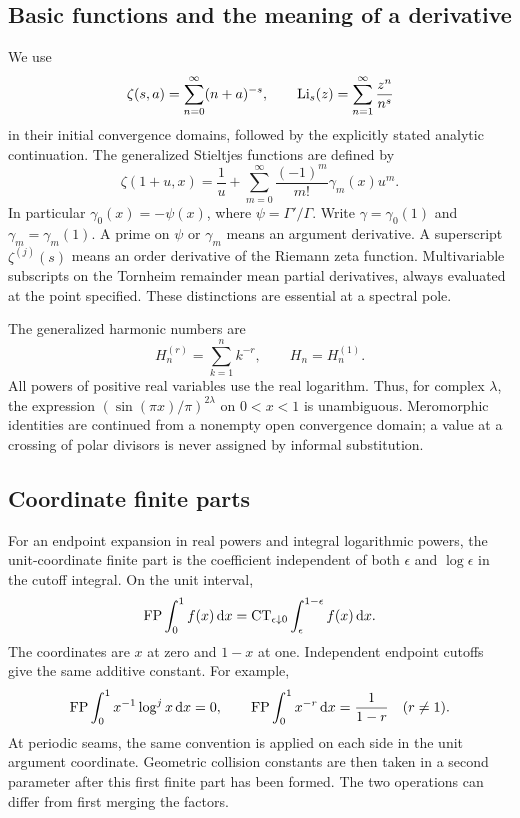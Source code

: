 \subsection{Basic functions and the meaning of a derivative}

We use
\[
 \zeta(s,a)=\sum_{n=0}^{\infty}(n+a)^{-s},\qquad
 \operatorname{Li}_s(z)=\sum_{n=1}^{\infty}\frac{z^n}{n^s}
\]
in their initial convergence domains, followed by the explicitly stated
analytic continuation. The generalized Stieltjes functions are defined by
\begin{equation}\label{scope:stieltjes}
 \zeta(1+u,x)=\frac1u+
       \sum_{m=0}^{\infty}\frac{(-1)^m}{m!}\gamma_m(x)u^m.
\end{equation}
In particular $\gamma_0(x)=-\psi(x)$, where
$\psi=\Gamma'/\Gamma$. Write $\gamma=\gamma_0(1)$ and
$\gamma_m=\gamma_m(1)$. A prime on $\psi$ or $\gamma_m$ means an
argument derivative. A superscript $\zeta^{(j)}(s)$ means an order
derivative of the Riemann zeta function. Multivariable subscripts on
the Tornheim remainder mean partial derivatives, always evaluated at
the point specified. These distinctions are essential at a spectral pole.

The generalized harmonic numbers are
\[
 H_n^{(r)}=\sum_{k=1}^n k^{-r},\qquad H_n=H_n^{(1)}.
\]
All powers of positive real variables use the real logarithm. Thus, for
complex $\lambda$, the expression $(\sin(\pi x)/\pi)^{2\lambda}$
on $0<x<1$ is unambiguous. Meromorphic identities are continued from
a nonempty open convergence domain; a value at a crossing of polar
divisors is never assigned by informal substitution.

\subsection{Coordinate finite parts}

For an endpoint expansion in real powers and integral logarithmic powers,
the unit-coordinate finite part is the coefficient independent of both
$\epsilon$ and $\log\epsilon$ in the cutoff integral. On the unit interval,
\begin{equation}\label{scope:FP}
 \operatorname{FP}\int_0^1 f(x)\,\mathrm d x
   =\operatorname{CT}_{\epsilon\downarrow0}\int_\epsilon^{1-\epsilon}f(x)\,\mathrm d x.
\end{equation}
The coordinates are $x$ at zero and $1-x$ at one. Independent endpoint
cutoffs give the same additive constant. For example,
\[
 \operatorname{FP}\int_0^1x^{-1}\log^j x\,\mathrm d x=0,\qquad
 \operatorname{FP}\int_0^1x^{-r}\,\mathrm d x=\frac1{1-r}\quad(r\ne1).
\]
At periodic seams, the same convention is applied on each side in the
unit argument coordinate. Geometric collision constants are then taken
in a second parameter after this first finite part has been formed.
The two operations can differ from first merging the factors.

